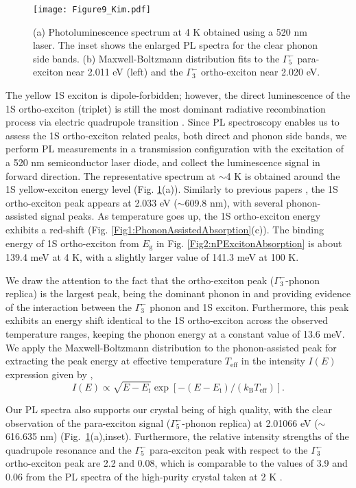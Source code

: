 \documentclass[aps,reprint,amsmath,amssymb,prb]{revtex4-1}
\begin{document}
\begin{figure}[htbp]
\texttt{[image: Figure9\_Kim.pdf]}
\caption{(a) Photoluminescence spectrum at 4 K obtained using a 520 nm laser. The inset shows the enlarged PL spectra for the clear phonon side bands. (b) Maxwell-Boltzmann distribution fits to the $\Gamma_{5}^{-}$ para-exciton near 2.011 eV (left) and the $\Gamma_{3}^{-}$ ortho-exciton near 2.020 eV. 
}
\label{Fig9:PL}
\end{figure}

The yellow 1S exciton is dipole-forbidden; however, the direct luminescence of the 1S ortho-exciton (triplet) is still the most dominant radiative recombination process via electric quadrupole transition \cite{Takahata2018}. Since PL spectroscopy enables us to assess the 1S ortho-exciton related peaks, both direct and phonon side bands, we perform PL measurements in a transmission configuration with the excitation of a 520 nm semiconductor laser diode, and collect the luminescence signal in forward direction.  
The representative spectrum at $\sim$4 K is obtained around the 1S yellow-exciton energy level (Fig. \ref{Fig9:PL}(a)). Similarly to previous papers \cite{Takahata2018}, the 1S ortho-exciton peak appears at 2.033 eV ($\sim$609.8 nm), with several phonon-assisted signal peaks. As temperature goes up,  the 1S ortho-exciton energy exhibits a red-shift (Fig. \ref{Fig1:PhononAssistedAbsorption}(c)). 
The binding energy of 1S ortho-exciton from $E_{\text{g}}$ in Fig. \ref{Fig2:nPExcitonAbsorption} is about 139.4 meV at 4 K, with a slightly larger value of 141.3 meV at 100 K. 

We draw the attention to the fact that the ortho-exciton peak ($\Gamma_{3}^{-}$-phonon replica) is the largest peak, being the dominant phonon in  and providing evidence of the interaction between the $\Gamma_{3}^{-}$ phonon and 1S exciton. Furthermore, this peak exhibits an energy shift identical to the 1S ortho-exciton across the observed temperature ranges, keeping the phonon energy at a constant value of 13.6 meV. We apply the Maxwell-Boltzmann distribution to the phonon-assisted peak for extracting the peak energy at effective temperature $T_{\mathrm{eff}}$ in the intensity $I(E)$ expression given by \cite{Takahata2018},
\begin{equation}I(E) \propto \sqrt{E-E_{\mathrm{i}}} \exp \left[-\left(E-E_{\mathrm{i}}\right) /\left(k_{\mathrm{B}} T_{\mathrm{eff}}\right)\right].
\end{equation}

Our PL spectra also supports our crystal being of high quality, with the clear observation of the para-exciton signal ($\Gamma_{5}^{-}$-phonon replica) at 2.01066 eV ($\sim$616.635 nm) (Fig.~\ref{Fig9:PL}(a),inset). Furthermore, the relative intensity strengths of the quadrupole resonance and the $\Gamma_{5}^{-}$ para-exciton peak with respect to the $\Gamma_{3}^{-}$ ortho-exciton peak are 2.2 and 0.08, which is comparable to the values of 3.9 and 0.06 from the PL spectra of the high-purity  crystal taken at 2 K \cite{YoshiokaPhD}.
\end{document}
